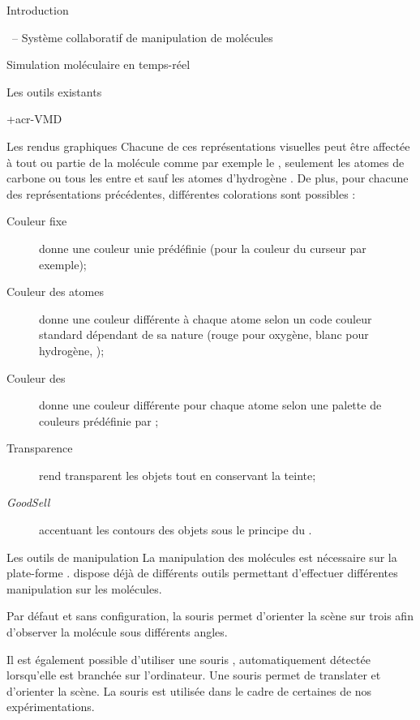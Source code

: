 \documentclass[myfrancais]{mythesis}
\begin{document}
\begin{mypart}{Introduction}
\begin{mychapter}{\myShaddock\ -- Système collaboratif de manipulation de molécules}
\begin{mysection}{Simulation moléculaire en temps-réel}
\begin{mysubsection}{Les outils existants}
\begin{mysubsubsection}{\myacronl+{acr-VMD}}
\begin{myparagraph}{Les rendus graphiques}
							Chacune de ces représentations visuelles peut être affectée à tout ou partie de la molécule comme par exemple \og le   \fg, \og seulement les atomes de carbone \fg ou \og tous les  entre  et  sauf les atomes d'hydrogène \fg.
							De plus, pour chacune des représentations précédentes, différentes colorations sont possibles :
							\begin{description}
								\item[Couleur fixe] donne une couleur unie prédéfinie (pour la couleur du curseur par exemple);
								\item[Couleur des atomes] donne une couleur différente à chaque atome selon un code couleur standard dépendant de sa nature (rouge pour oxygène, blanc pour hydrogène, \myetc);
								\item[Couleur des ] donne une couleur différente pour chaque atome selon une palette de couleurs prédéfinie par ;
								\item[Transparence] rend transparent les objets tout en conservant la teinte;
								\item[\textit{GoodSell}] accentuant les contours des objets sous le principe du .
							\end{description}
						\end{myparagraph}
						\begin{myparagraph}{Les outils de manipulation}
							La manipulation des molécules est nécessaire sur la plate-forme \myShaddock.
							 dispose déjà de différents outils permettant d'effectuer différentes manipulation sur les molécules.

							Par défaut et sans configuration, la souris permet d'orienter la scène sur trois  afin d'observer la molécule sous différents angles.

							Il est également possible d'utiliser une souris \myThreeD, automatiquement détectée lorsqu'elle est branchée sur l'ordinateur.
							Une souris \myThreeD permet de translater et d'orienter la scène.
							La souris \myThreeD \mySpaceNavigator est utilisée dans le cadre de certaines de nos expérimentations.


\end{myparagraph}
\end{mysubsubsection}
\end{mysubsection}
\end{mysection}
\end{mychapter}
\end{mypart}
\end{document}
